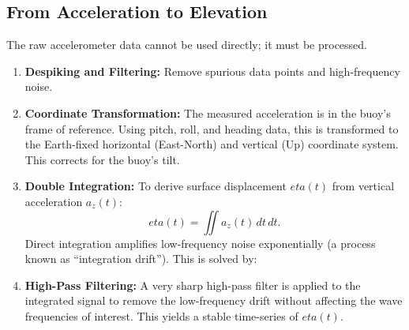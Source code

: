 \documentclass[journal,10pt,twocolumn]{IEEEtran}
\def\eta{eta}%
\begin{document}
    \subsection{From Acceleration to Elevation}
    The raw accelerometer data cannot be used directly; it must be processed.
    \begin{enumerate}[leftmargin=1.5em]
        \item \textbf{Despiking and Filtering:} Remove spurious data points and high-frequency noise.
        \item \textbf{Coordinate Transformation:} The measured acceleration is in the buoy's frame of reference. Using pitch, roll, and heading data, this is transformed to the Earth-fixed horizontal (East-North) and vertical (Up) coordinate system. This corrects for the buoy's tilt.
        \item \textbf{Double Integration:} To derive surface displacement $\eta(t)$ from vertical acceleration $a_z(t)$:
        \begin{equation}
            \eta(t) = \iint a_z(t)\, dt\, dt.
        \end{equation}
        Direct integration amplifies low-frequency noise exponentially (a process known as ``integration drift''). This is solved by:
        \item \textbf{High-Pass Filtering:} A very sharp high-pass filter is applied to the integrated signal to remove the low-frequency drift without affecting the wave frequencies of interest. This yields a stable time-series of $\eta(t)$.
    \end{enumerate}
\end{document}
